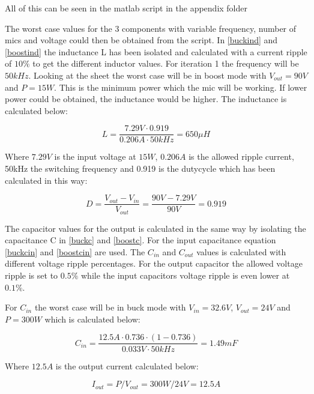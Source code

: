All of this can be seen in the matlab script in the appendix folder  

The worst case values for the 3 components with variable frequency, number of mics and voltage could then be obtained from the script. 
In \ref{buckind} and \ref{boostind} the inductance L has been isolated and calculated with a current ripple of $10\%$ to get the different inductor values. For iteration 1 the frequency will be $50kHz$. Looking at the sheet the worst case will be in boost mode with $V_{out}=90V$ and $P=15W$. This is the minimum power which the mic will be working. If lower power could be obtained, the inductance would be higher. The inductance is calculated below:

\begin{equation}\label{buckind}
L = \frac{7.29V\cdot 0.919}{0.206A\cdot 50kHz} = 650\mu H
\end{equation} 

Where $7.29V$ is the input voltage at $15W$, $0.206A$ is the allowed ripple current, 50kHz the switching frequency and 0.919 is the dutycycle which has been calculated in this way:

\begin{equation}
D = \frac{V_{out}-V_{in}}{V_{out}} = \frac{90V-7.29V}{90V} = 0.919
\end{equation} 

The capacitor values for the output is calculated in the same way by isolating the capacitance C in \ref{buckc} and \ref{boostc}. For the input capacitance equation \ref{buckcin} and \ref{boostcin} are used.
The $C_{in}$ and $C_{out}$ values is calculated with different voltage ripple percentages. For the output capacitor the allowed voltage ripple is set to $0.5\%$ while the input capacitors voltage ripple is even lower at $0.1\%$. 

For $C_{in}$ the worst case will be in buck mode with $V_{in}=32.6V$, $V_{out}=24V$ and $P=300W$ which is calculated below:

\begin{equation}
C_{in} = \frac{12.5A\cdot 0.736\cdot (1-0.736)}{0.033V\cdot 50kHz} = 1.49mF
\end{equation}    

Where $12.5A$ is the output current calculated below:

\begin{equation}
I_{out} = P/V_{out} = 300W/24V = 12.5A
\end{equation}

